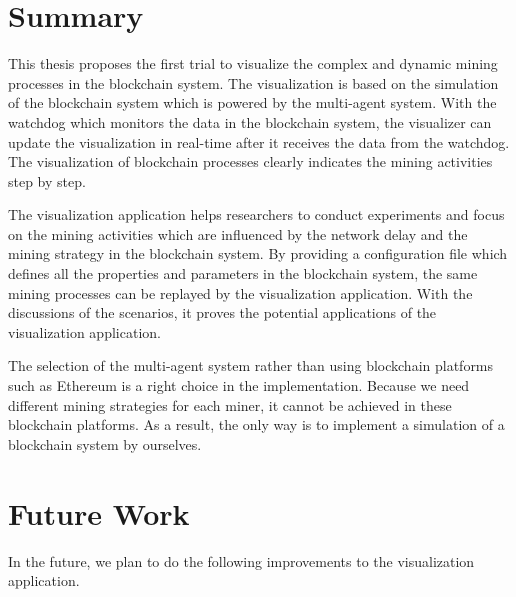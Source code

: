 \section{Summary}

This thesis proposes the first trial to visualize the complex and dynamic mining processes in the blockchain system. The visualization is based on the simulation of the blockchain system which is powered by the multi-agent system. With the watchdog which monitors the data in the blockchain system, the visualizer can update the visualization in real-time after it receives the data from the watchdog. The visualization of blockchain processes clearly indicates the mining activities step by step. 

The visualization application helps researchers to conduct experiments and focus on the mining activities which are influenced by the network delay and the mining strategy in the blockchain system. By providing a configuration file which defines all the properties and parameters in the blockchain system, the same mining processes can be replayed by the visualization application. With the discussions of the scenarios, it proves the potential applications of the visualization application.

The selection of the multi-agent system rather than using blockchain platforms such as Ethereum is a right choice in the implementation. Because we need different mining strategies for each miner, it cannot be achieved in these blockchain platforms. As a result, the only way is to implement a simulation of a blockchain system by ourselves.

\section{Future Work}

In the future, we plan to do the following improvements to the visualization application.

